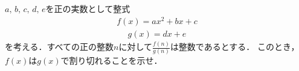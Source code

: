 \documentclass[../../main.tex]{subfiles}
\begin{document}
$a, \, b, \, c, \, d, \, e$を正の実数として整式
\begin{align*}
  f(x)=ax^2+bx+c
\end{align*}
\begin{align*}
  g(x)=dx+e
\end{align*}
を考える．すべての正の整数$n$に対して$\displaystyle\frac{f(n)}{g(n)}$は整数であるとする．
このとき，$f(x)$は$g(x)$で割り切れることを示せ．
\end{document}
